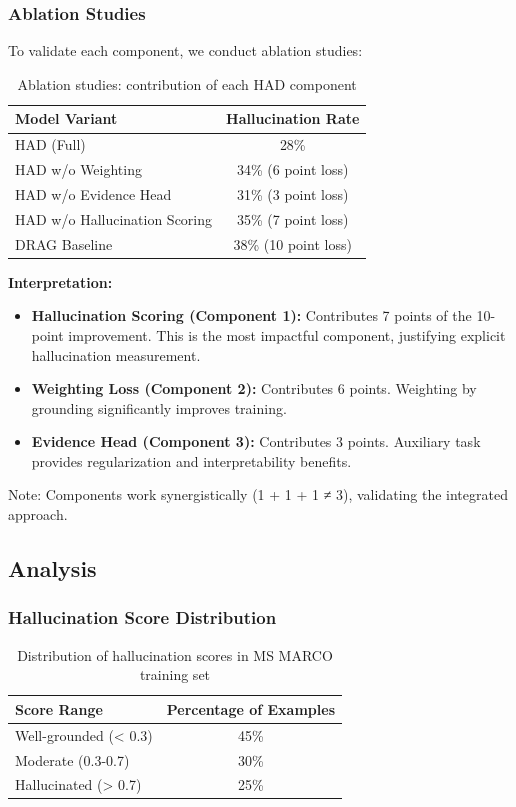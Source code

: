 \documentclass[11pt,a4paper]{article}
\begin{document}
\subsubsection{Ablation Studies}

To validate each component, we conduct ablation studies:

\begin{table}[H]
\centering
\begin{tabular}{lc}
\toprule
\textbf{Model Variant} & \textbf{Hallucination Rate} \\
\midrule
HAD (Full) & 28\% \\
HAD w/o Weighting & 34\% (6 point loss) \\
HAD w/o Evidence Head & 31\% (3 point loss) \\
HAD w/o Hallucination Scoring & 35\% (7 point loss) \\
DRAG Baseline & 38\% (10 point loss) \\
\bottomrule
\end{tabular}
\caption{Ablation studies: contribution of each HAD component}
\label{table:ablations}
\end{table}

\textbf{Interpretation:}
\begin{itemize}
    \item \textbf{Hallucination Scoring (Component 1):} Contributes 7 points of the 10-point improvement. This is the most impactful component, justifying explicit hallucination measurement.
    \item \textbf{Weighting Loss (Component 2):} Contributes 6 points. Weighting by grounding significantly improves training.
    \item \textbf{Evidence Head (Component 3):} Contributes 3 points. Auxiliary task provides regularization and interpretability benefits.
\end{itemize}

Note: Components work synergistically (1 + 1 + 1 ≠ 3), validating the integrated approach.

\subsection{Analysis}

\subsubsection{Hallucination Score Distribution}

\begin{table}[H]
\centering
\begin{tabular}{lc}
\toprule
\textbf{Score Range} & \textbf{Percentage of Examples} \\
\midrule
Well-grounded (< 0.3) & 45\% \\
Moderate (0.3-0.7) & 30\% \\
Hallucinated (> 0.7) & 25\% \\
\bottomrule
\end{tabular}
\caption{Distribution of hallucination scores in MS MARCO training set}
\label{table:dist}
\end{table}
\end{document}
